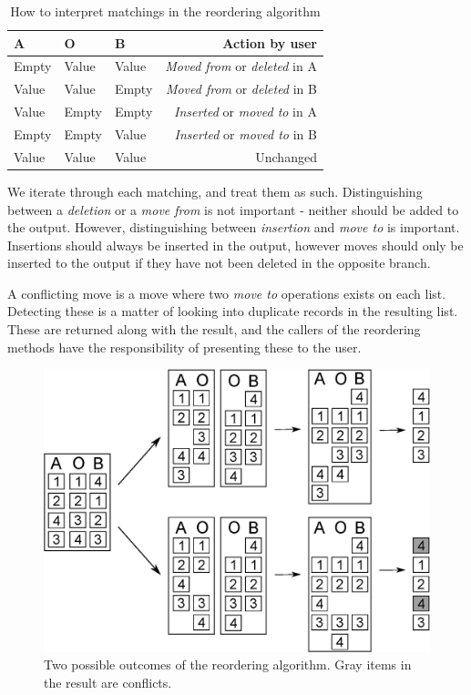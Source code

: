 \documentclass[11pt]{article}
\begin{document}
\begin{table}

\centering
\begin{tabular}{ | l | l | l || r |}
  \hline                        
   \textbf{A} & \textbf{O} & \textbf{B} & \textbf{Action by user} \\
  \hline                        
  Empty & Value & Value & \textit{Moved from} or \textit{deleted} in A \\
  Value & Value & Empty & \textit{Moved from} or \textit{deleted} in B \\
  Value & Empty & Empty & \textit{Inserted} or \textit{moved to} in A \\
  Empty & Empty & Value & \textit{Inserted} or \textit{moved to} in B \\
  Value & Value & Value & Unchanged \\
  \hline  
\end{tabular}
  \caption{How to interpret matchings in the reordering algorithm}
\label{ReorderingTable}
\end{table}

We iterate through each matching, and treat them as such. Distinguishing between a \textit{deletion} or a \textit{move from} is not important - neither should be added to the output. However, distinguishing between \textit{insertion} and \textit{move to} is important. Insertions should always be inserted in the output, however moves should only be inserted to the output if they have not been deleted in the opposite branch. 

A conflicting move is a move where two \textit{move to} operations exists on each list. Detecting these is a matter of looking into duplicate records in the resulting list. These are returned along with the result, and the callers of the reordering methods have the responsibility of presenting these to the user.

\begin{figure}
   \centerline{\includegraphics[scale=0.55]{drawings/eps/reordering.eps}}
   \caption{Two possible outcomes of the reordering algorithm. Gray items in the result are conflicts.}
   \label{Reordering}
\end{figure}
\end{document}
